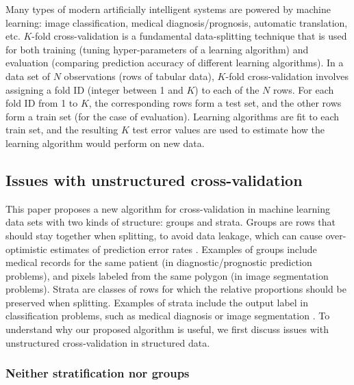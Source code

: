 \documentclass[twoside]{article}
\begin{document}
Many types of modern artificially intelligent systems are powered by machine learning: image classification, medical diagnosis/prognosis, automatic translation, etc.
$K$-fold cross-validation \citep{Arl_Cel:2010:surveyCV,raschka2020modelevaluationmodelselection} is a fundamental data-splitting technique that is used for both training (tuning hyper-parameters of a learning algorithm) and evaluation (comparing prediction accuracy of different learning algorithms).
In a data set of $N$ observations (rows of tabular data), $K$-fold cross-validation involves assigning a fold ID (integer between 1 and $K$) to each of the $N$ rows.
For each fold ID from 1 to $K$, the corresponding rows form a test set, and the other rows form a train set (for the case of evaluation).
Learning algorithms are fit to each train set, and the resulting $K$ test error values are used to estimate how the learning algorithm would perform on new data.


\subsection{Issues with unstructured cross-validation}

This paper proposes a new algorithm for cross-validation in machine learning data sets with two kinds of structure: groups and strata.
Groups are rows that should stay together when splitting, to avoid data leakage, which can cause over-optimistic estimates of prediction error rates  \citep{kaufman2012leakage,kapoor2023leakage}.
Examples of groups include medical records for the same patient (in diagnostic/prognostic prediction problems), and pixels labeled from the same polygon (in image segmentation problems).
Strata are classes of rows for which the relative proportions should be preserved when splitting.
Examples of strata include the output label in classification problems, such as medical diagnosis or image segmentation \citep{russell2008labelme, asif2025advancements}.
To understand why our proposed algorithm is useful, we first discuss issues with unstructured cross-validation in structured data.

\subsubsection{
  Neither stratification nor groups}
\end{document}
